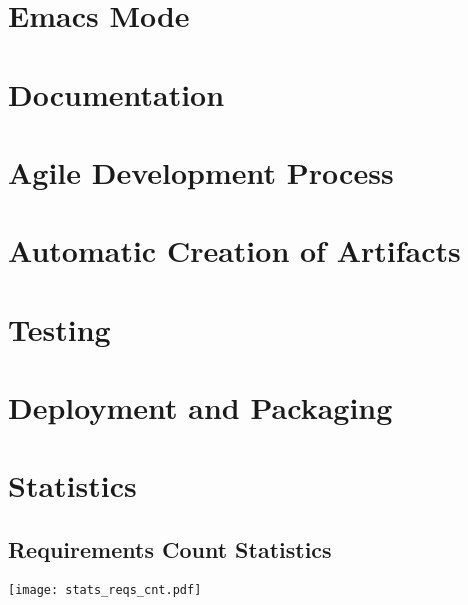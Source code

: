\documentclass{article}
\begin{document}
\section{Emacs Mode}








\section{Documentation}










\section{Agile Development Process}



\section{Automatic Creation of Artifacts}



\section{Testing}






\section{Deployment and Packaging}



\section{Statistics}
\subsection{Requirements Count Statistics}
\texttt{[image: stats\_reqs\_cnt.pdf]}
\end{document}
